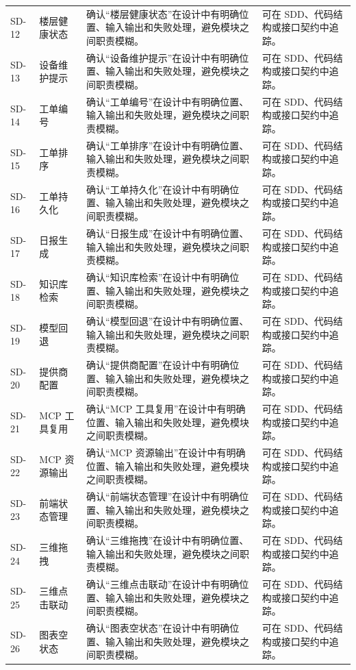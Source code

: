 \documentclass[12pt,a4paper]{ctexart}
\begin{document}
\begin{longtable}{L{1.7cm}L{3.2cm}L{6.4cm}L{4.0cm}}
SD-12 & 楼层健康状态 & 确认“楼层健康状态”在设计中有明确位置、输入输出和失败处理，避免模块之间职责模糊。 & 可在 SDD、代码结构或接口契约中追踪。 \\
SD-13 & 设备维护提示 & 确认“设备维护提示”在设计中有明确位置、输入输出和失败处理，避免模块之间职责模糊。 & 可在 SDD、代码结构或接口契约中追踪。 \\
SD-14 & 工单编号 & 确认“工单编号”在设计中有明确位置、输入输出和失败处理，避免模块之间职责模糊。 & 可在 SDD、代码结构或接口契约中追踪。 \\
SD-15 & 工单排序 & 确认“工单排序”在设计中有明确位置、输入输出和失败处理，避免模块之间职责模糊。 & 可在 SDD、代码结构或接口契约中追踪。 \\
SD-16 & 工单持久化 & 确认“工单持久化”在设计中有明确位置、输入输出和失败处理，避免模块之间职责模糊。 & 可在 SDD、代码结构或接口契约中追踪。 \\
SD-17 & 日报生成 & 确认“日报生成”在设计中有明确位置、输入输出和失败处理，避免模块之间职责模糊。 & 可在 SDD、代码结构或接口契约中追踪。 \\
SD-18 & 知识库检索 & 确认“知识库检索”在设计中有明确位置、输入输出和失败处理，避免模块之间职责模糊。 & 可在 SDD、代码结构或接口契约中追踪。 \\
SD-19 & 模型回退 & 确认“模型回退”在设计中有明确位置、输入输出和失败处理，避免模块之间职责模糊。 & 可在 SDD、代码结构或接口契约中追踪。 \\
SD-20 & 提供商配置 & 确认“提供商配置”在设计中有明确位置、输入输出和失败处理，避免模块之间职责模糊。 & 可在 SDD、代码结构或接口契约中追踪。 \\
SD-21 & MCP 工具复用 & 确认“MCP 工具复用”在设计中有明确位置、输入输出和失败处理，避免模块之间职责模糊。 & 可在 SDD、代码结构或接口契约中追踪。 \\
SD-22 & MCP 资源输出 & 确认“MCP 资源输出”在设计中有明确位置、输入输出和失败处理，避免模块之间职责模糊。 & 可在 SDD、代码结构或接口契约中追踪。 \\
SD-23 & 前端状态管理 & 确认“前端状态管理”在设计中有明确位置、输入输出和失败处理，避免模块之间职责模糊。 & 可在 SDD、代码结构或接口契约中追踪。 \\
SD-24 & 三维拖拽 & 确认“三维拖拽”在设计中有明确位置、输入输出和失败处理，避免模块之间职责模糊。 & 可在 SDD、代码结构或接口契约中追踪。 \\
SD-25 & 三维点击联动 & 确认“三维点击联动”在设计中有明确位置、输入输出和失败处理，避免模块之间职责模糊。 & 可在 SDD、代码结构或接口契约中追踪。 \\
SD-26 & 图表空状态 & 确认“图表空状态”在设计中有明确位置、输入输出和失败处理，避免模块之间职责模糊。 & 可在 SDD、代码结构或接口契约中追踪。 \\

\end{longtable}
\end{document}
